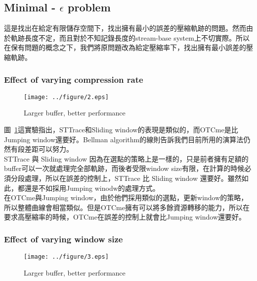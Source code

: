 \documentclass[12pt]{article}
\begin{document}
\begin{CJK}{UTF8}{bsmi}
\subsection{Minimal - $\epsilon$ problem}

這是找出在給定有限儲存空間下，找出擁有最小的誤差的壓縮軌跡的問題。然而由於軌跡長度不定，而且對於不知記錄長度的stream-base system上不切實際。所以在保有問題的概念之下，我們將原問題改為給定壓縮率下，找出擁有最小誤差的壓縮軌跡。



\subsubsection{Effect of varying compression rate}


\begin{figure}[ht]
\begin{center}
\texttt{[image: ../figure/2.eps]}
\caption{Larger buffer, better performance}
\label{fig:fig2}
\end{center}
\end{figure}

圖~\ref{fig:fig2}這實驗指出，STTrace和Sliding window的表現是類似的，而OTCme是比Jumping window還要好。Bellman algorithm的線則告訴我們目前所用的演算法仍然有段差距可以努力。\\

STTrace 與 Sliding window 因為在選點的策略上是一樣的，只是前者擁有足額的buffer可以一次就處理完全部軌跡，而後者受限window size有限，在計算的時候必須分段處理，所以在誤差的控制上，STTrace 比 Sliding window 還要好。雖然如此，都還是不如採用Jumping winodw的處理方式。\\

在OTCme與Jumping window，由於他們採用類似的選點，更新window的策略，所以整體曲線會相當類似。但是OTCme擁有可以將多餘資源轉移的能力，所以在要求高壓縮率的時候，OTCme在誤差的控制上就會比Jumping window還要好。\\




\subsubsection{Effect of varying window size}



\begin{figure}[ht]
\begin{center}
\texttt{[image: ../figure/3.eps]}
\caption{Larger buffer, better performance\label{fig:fig3}}


\end{center}
\end{figure}
\end{CJK}
\end{document}
